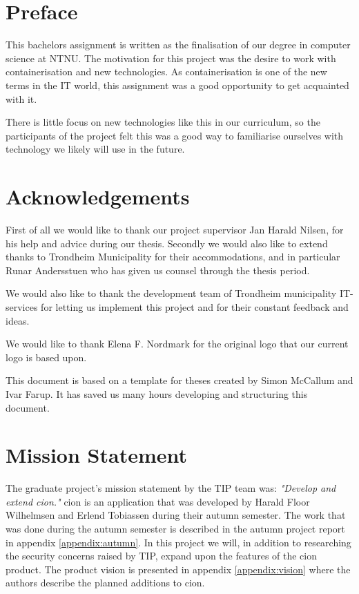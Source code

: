 \chapter*{Preface} %
\label{chap:preface}

This bachelors assignment is written as the finalisation of our degree in computer science at NTNU. The motivation for this project was the desire to work with containerisation and new technologies. As containerisation is one of the new terms in the IT world, this assignment was a good opportunity to get acquainted with it.

There is little focus on new technologies like this in our curriculum, so the participants of the project felt this was a good way to familiarise ourselves with technology we likely will use in the future.

\chapter*{Acknowledgements}
First of all we would like to thank our project supervisor Jan Harald Nilsen, for his help and advice during our thesis. Secondly we would also like to extend thanks to Trondheim Municipality for their accommodations, and in particular Runar Andersstuen who has given us counsel through the thesis period.

We would also like to thank the development team of Trondheim municipality IT-services for letting us implement this project and for their constant feedback and ideas.

We would like to thank Elena F. Nordmark for the original logo that our current logo is based upon.

This document is based on a template for theses created by Simon McCallum and Ivar Farup\cite{thesis-ntnu}. It has saved us many hours developing and structuring this document.

\chapter*{Mission Statement}
The graduate project's mission statement by the \acrfull{TIP} team was: \textit{"Develop and extend cion."} cion is an application that was developed by Harald Floor Wilhelmsen and Erlend Tobiassen during their autumn semester. The work that was done during the autumn semester is described in the autumn project report in appendix \ref{appendix:autumn}. In this project we will, in addition to researching the security concerns raised by \acrshort{TIP}, expand upon the features of the cion product. The product vision is presented in appendix \ref{appendix:vision} where the authors describe the planned additions to cion. 



